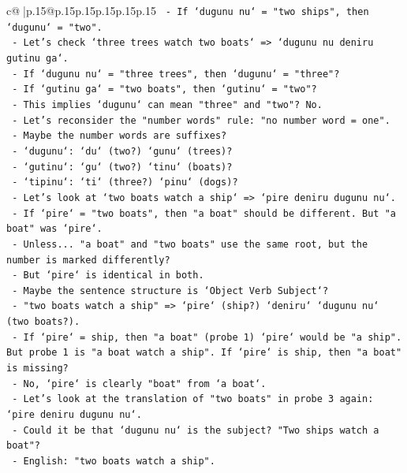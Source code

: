 \documentclass{article}
\begin{document}
{\begin{supertabular}{c@{$\;$}|p{.15\linewidth}@{}p{.15\linewidth}p{.15\linewidth}p{.15\linewidth}p{.15\linewidth}p{.15\linewidth}}
{{{\texttt{     {-} If `dugunu nu` = "two ships", then `dugunu` = "two".} \\
\texttt{     {-} Let's check `three trees watch two boats` => `dugunu nu deniru gutinu ga`.} \\
\texttt{       {-} If `dugunu nu` = "three trees", then `dugunu` = "three"?} \\
\texttt{       {-} If `gutinu ga` = "two boats", then `gutinu` = "two"?} \\
\texttt{     {-} This implies `dugunu` can mean "three" and "two"? No.} \\
\texttt{     {-} Let's reconsider the "number words" rule: "no number word = one".} \\
\texttt{     {-} Maybe the number words are suffixes?} \\
\texttt{     {-} `dugunu`: `du` (two?) `gunu` (trees)?} \\
\texttt{     {-} `gutinu`: `gu` (two?) `tinu` (boats)?} \\
\texttt{     {-} `tipinu`: `ti` (three?) `pinu` (dogs)?} \\
\texttt{     {-} Let's look at `two boats watch a ship` => `pire deniru dugunu nu`.} \\
\texttt{       {-} If `pire` = "two boats", then "a boat" should be different. But "a boat" was `pire`.} \\
\texttt{       {-} Unless... "a boat" and "two boats" use the same root, but the number is marked differently?} \\
\texttt{       {-} But `pire` is identical in both.} \\
\texttt{       {-} Maybe the sentence structure is `Object Verb Subject`?} \\
\texttt{         {-} "two boats watch a ship" => `pire` (ship?) `deniru` `dugunu nu` (two boats?).} \\
\texttt{         {-} If `pire` = ship, then "a boat" (probe 1) `pire` would be "a ship". But probe 1 is "a boat watch a ship". If `pire` is ship, then "a boat" is missing?} \\
\texttt{         {-} No, `pire` is clearly "boat" from `a boat`.} \\
\texttt{       {-} Let's look at the translation of "two boats" in probe 3 again: `pire deniru dugunu nu`.} \\
\texttt{       {-} Could it be that `dugunu nu` is the subject? "Two ships watch a boat"?} \\
\texttt{         {-} English: "two boats watch a ship".} \\
}}}
\end{supertabular}}
\end{document}
